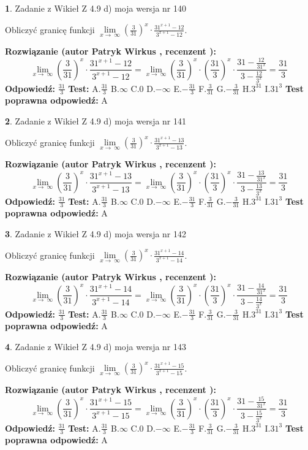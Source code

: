 \documentclass[12pt, a4paper]{article}
\theoremstyle{definition} %
\newtheorem{zad}{}
\newcommand{\zadStart}[1]{\begin{zad}#1\newline}
\newcommand{\zadStop}{\end{zad}}
\newcommand{\rozwStart}[2]{\noindent \textbf{Rozwiązanie (autor #1 , recenzent #2): }\newline}
\newcommand{\rozwStop}{\newline}
\newcommand{\odpStart}{\noindent \textbf{Odpowiedź:}\newline}
\newcommand{\odpStop}{\newline}
\newcommand{\testStart}{\noindent \textbf{Test:}\newline}
\newcommand{\testStop}{\newline}
\newcommand{\kluczStart}{\noindent \textbf{Test poprawna odpowiedź:}\newline}
\newcommand{\kluczStop}{\newline}
\begin{document}
\zadStart{Zadanie z Wikieł Z 4.9 d) moja wersja nr 140}


Obliczyć granicę funkcji  $\lim\limits_{x\to\ \infty}(\frac{3}{31})^{x}\cdot\frac{31^{x+1}-12}{3^{x+1}-12}$.
\zadStop
\rozwStart{Patryk Wirkus}{}
$$\lim\limits_{x\to\ \infty}(\frac{3}{31})^{x}\cdot\frac{31^{x+1}-12}{3^{x+1}-12}=\lim\limits_{x\to\ \infty}(\frac{3}{31})^{x}\cdot(\frac{31}{3})^{x} \cdot \frac{31-\frac{12}{31^{x}}}{3-\frac{12}{3^{x}}} = \frac{31}{3}$$
\rozwStop
\odpStart
$\frac{31}{3}$
\odpStop
\testStart
A.$\frac{31}{3}$ B.$\infty$ C.$0$ D.$-\infty$ E.$-\frac{31}{3}$
F.$\frac{3}{31}$ G.$-\frac{3}{31}$
H.$3^{31}$
I.$31^{3}$
\testStop
\kluczStart
A
\kluczStop



\zadStart{Zadanie z Wikieł Z 4.9 d) moja wersja nr 141}


Obliczyć granicę funkcji  $\lim\limits_{x\to\ \infty}(\frac{3}{31})^{x}\cdot\frac{31^{x+1}-13}{3^{x+1}-13}$.
\zadStop
\rozwStart{Patryk Wirkus}{}
$$\lim\limits_{x\to\ \infty}(\frac{3}{31})^{x}\cdot\frac{31^{x+1}-13}{3^{x+1}-13}=\lim\limits_{x\to\ \infty}(\frac{3}{31})^{x}\cdot(\frac{31}{3})^{x} \cdot \frac{31-\frac{13}{31^{x}}}{3-\frac{13}{3^{x}}} = \frac{31}{3}$$
\rozwStop
\odpStart
$\frac{31}{3}$
\odpStop
\testStart
A.$\frac{31}{3}$ B.$\infty$ C.$0$ D.$-\infty$ E.$-\frac{31}{3}$
F.$\frac{3}{31}$ G.$-\frac{3}{31}$
H.$3^{31}$
I.$31^{3}$
\testStop
\kluczStart
A
\kluczStop



\zadStart{Zadanie z Wikieł Z 4.9 d) moja wersja nr 142}


Obliczyć granicę funkcji  $\lim\limits_{x\to\ \infty}(\frac{3}{31})^{x}\cdot\frac{31^{x+1}-14}{3^{x+1}-14}$.
\zadStop
\rozwStart{Patryk Wirkus}{}
$$\lim\limits_{x\to\ \infty}(\frac{3}{31})^{x}\cdot\frac{31^{x+1}-14}{3^{x+1}-14}=\lim\limits_{x\to\ \infty}(\frac{3}{31})^{x}\cdot(\frac{31}{3})^{x} \cdot \frac{31-\frac{14}{31^{x}}}{3-\frac{14}{3^{x}}} = \frac{31}{3}$$
\rozwStop
\odpStart
$\frac{31}{3}$
\odpStop
\testStart
A.$\frac{31}{3}$ B.$\infty$ C.$0$ D.$-\infty$ E.$-\frac{31}{3}$
F.$\frac{3}{31}$ G.$-\frac{3}{31}$
H.$3^{31}$
I.$31^{3}$
\testStop
\kluczStart
A
\kluczStop



\zadStart{Zadanie z Wikieł Z 4.9 d) moja wersja nr 143}


Obliczyć granicę funkcji  $\lim\limits_{x\to\ \infty}(\frac{3}{31})^{x}\cdot\frac{31^{x+1}-15}{3^{x+1}-15}$.
\zadStop
\rozwStart{Patryk Wirkus}{}
$$\lim\limits_{x\to\ \infty}(\frac{3}{31})^{x}\cdot\frac{31^{x+1}-15}{3^{x+1}-15}=\lim\limits_{x\to\ \infty}(\frac{3}{31})^{x}\cdot(\frac{31}{3})^{x} \cdot \frac{31-\frac{15}{31^{x}}}{3-\frac{15}{3^{x}}} = \frac{31}{3}$$
\rozwStop
\odpStart
$\frac{31}{3}$
\odpStop
\testStart
A.$\frac{31}{3}$ B.$\infty$ C.$0$ D.$-\infty$ E.$-\frac{31}{3}$
F.$\frac{3}{31}$ G.$-\frac{3}{31}$
H.$3^{31}$
I.$31^{3}$
\testStop
\kluczStart
A
\kluczStop
\end{document}

